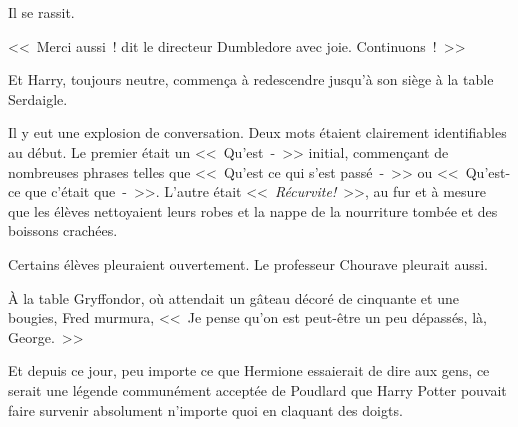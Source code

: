 Il se rassit.

<<~Merci aussi~! dit le directeur Dumbledore avec joie. Continuons~!~>>

Et Harry, toujours neutre, commença à redescendre jusqu'à son siège à la table Serdaigle.

Il y eut une explosion de conversation. Deux mots étaient clairement identifiables au début. Le premier était un <<~Qu'est~-~>> initial, commençant de nombreuses phrases telles que <<~Qu'est ce qui s'est passé~-~>> ou <<~Qu'est-ce que c'était que~-~>>. L'autre était <<~\emph{Récurvite!}~>>, au fur et à mesure que les élèves nettoyaient leurs robes et la nappe de la nourriture tombée et des boissons crachées.

Certains élèves pleuraient ouvertement. Le professeur Chourave pleurait aussi.

À la table Gryffondor, où attendait un gâteau décoré de cinquante et une bougies, Fred murmura, <<~Je pense qu'on est peut-être un peu dépassés, là, George.~>>

Et depuis ce jour, peu importe ce que Hermione essaierait de dire aux gens, ce serait une légende communément acceptée de Poudlard que Harry Potter pouvait faire survenir absolument n'importe quoi en claquant des doigts.~ 

